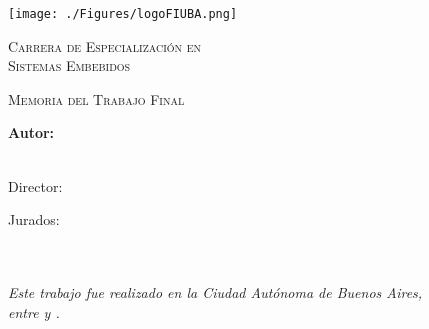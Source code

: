 \documentclass[
11pt, %
spanish,
singlespacing, %
parskip, %
headsepline, %
]{MastersDoctoralThesis} %
\author{Ing. Alexis Martin Pojomovsky} %
\begin{document}
\frontmatter %

\pagestyle{plain} %


\begin{titlepage}
\begin{center}


\texttt{[image: ./Figures/logoFIUBA.png]}
\vspace{2cm}

\textsc{\huge{Carrera de Especialización en\\ \vspace{5px} Sistemas Embebidos}}
\vspace{.5cm} %

\textsc{\Large Memoria del Trabajo Final}\\[1cm] %
{\huge \bfseries \ttitle\par}\vspace{0.4cm} %

\vfill

\vspace{1.5cm}
\LARGE\textbf{Autor:\\
\authorname}\\ %

\vspace{1.5cm}

\large
{Director:} \\
{\supname} %
 
\vspace{1cm}
Jurados:\\	
\jurunoname\\
\jurdosname\\
\jurtresname

\vspace{2cm}

\textit{Este trabajo fue realizado en la Ciudad Autónoma de Buenos Aires,\\ entre \fechaINICIOname \hspace{1px} y \fechaFINALname.}
\end{center}
\end{titlepage}
\end{document}
